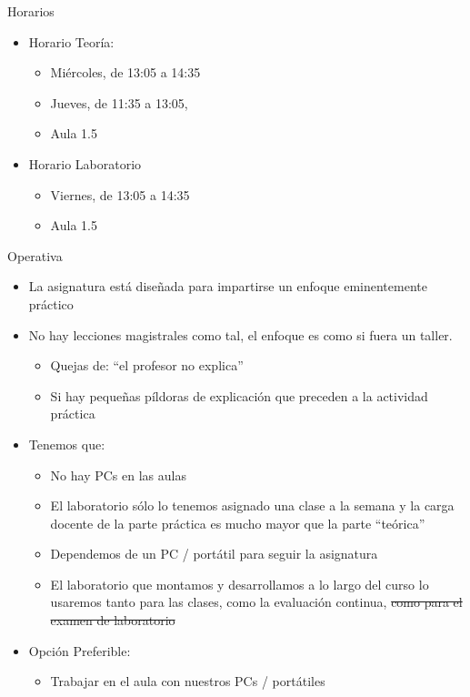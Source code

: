 \documentclass[aspectratio=169,11pt]{beamer}
\begin{document}
\begin{frame}[allowframebreaks]{Horarios}
\small
\begin{itemize}
  \item Horario Teoría:
  \begin{itemize}
    \item Miércoles, de 13:05 a 14:35
    \item Jueves, de 11:35 a 13:05,
    \item Aula 1.5
  \end{itemize}
  \item Horario Laboratorio
  \begin{itemize}
    \item Viernes, de 13:05 a 14:35
    \item Aula 1.5
  \end{itemize}
\end{itemize}
\end{frame}

\begin{frame}[allowframebreaks]{Operativa}
\small
\begin{itemize}
  \item La asignatura está diseñada para impartirse un enfoque eminentemente práctico
  \item No hay lecciones magistrales como tal, el enfoque es como si fuera un taller.
  \begin{itemize}
    \item Quejas de: “el profesor no explica”
    \item Si hay pequeñas píldoras de explicación que preceden a la actividad práctica
  \end{itemize}
  \item Tenemos que:
  \begin{itemize}
    \item No hay PCs en las aulas
    \item El laboratorio sólo lo tenemos asignado una clase a la semana y la carga docente de la parte práctica es mucho mayor que la parte “teórica”
    \item Dependemos de un PC / portátil para seguir la asignatura
    \item El laboratorio que montamos y desarrollamos a lo largo del curso lo usaremos tanto para las clases, como la evaluación continua, \sout{como para el examen de laboratorio}
  \end{itemize}
  \item Opción Preferible:
  \begin{itemize}
    \item Trabajar en el aula con nuestros PCs / portátiles
  \end{itemize}
\end{itemize}
\end{frame}
\end{document}
